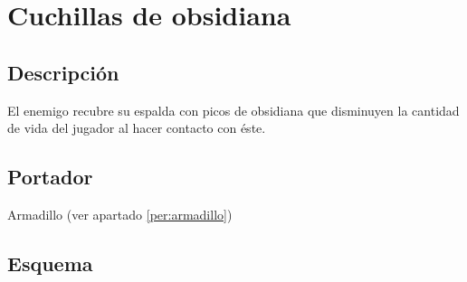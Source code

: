 	\section{Cuchillas de obsidiana} \label{hab.CuchObs}	
		\subsection{Descripción}
		El enemigo recubre su espalda con picos de obsidiana que disminuyen la cantidad de vida del jugador al hacer contacto con éste.
		\subsection{Portador}
		Armadillo (ver apartado \ref{per:armadillo})
		\subsection{Esquema}